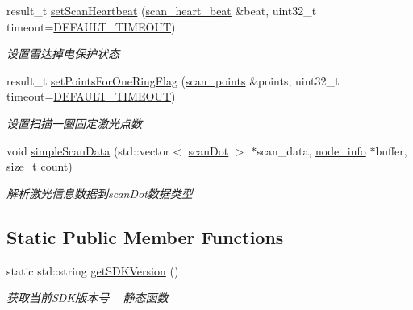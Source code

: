 \begin{DoxyCompactItemize}
\begin{DoxyCompactList}
\end{DoxyCompactList}\item 
result\+\_\+t \hyperlink{classydlidar_1_1_y_dlidar_driver_ab2d5434c9b640a38f9d3b43b07c0b3eb}{set\+Scan\+Heartbeat} (\hyperlink{structscan__heart__beat}{scan\+\_\+heart\+\_\+beat} \&beat, uint32\+\_\+t timeout=\hyperlink{classydlidar_1_1_y_dlidar_driver_a13a4f2dc4067b43794b2c47c06d5d27aa07c79ce96f468ff4b40495ef84584442}{D\+E\+F\+A\+U\+L\+T\+\_\+\+T\+I\+M\+E\+O\+UT})
\begin{DoxyCompactList}\small\item\em 设置雷达掉电保护状态 ~\newline
\end{DoxyCompactList}\item 
result\+\_\+t \hyperlink{classydlidar_1_1_y_dlidar_driver_a1c8d40889885386e6c5a7827b7747696}{set\+Points\+For\+One\+Ring\+Flag} (\hyperlink{structscan__points}{scan\+\_\+points} \&points, uint32\+\_\+t timeout=\hyperlink{classydlidar_1_1_y_dlidar_driver_a13a4f2dc4067b43794b2c47c06d5d27aa07c79ce96f468ff4b40495ef84584442}{D\+E\+F\+A\+U\+L\+T\+\_\+\+T\+I\+M\+E\+O\+UT})
\begin{DoxyCompactList}\small\item\em 设置扫描一圈固定激光点数 ~\newline
\end{DoxyCompactList}\item 
void \hyperlink{classydlidar_1_1_y_dlidar_driver_a797de2678c6c81c84a8126cf184a0254}{simple\+Scan\+Data} (std\+::vector$<$ \hyperlink{structscan_dot}{scan\+Dot} $>$ $\ast$scan\+\_\+data, \hyperlink{structnode__info}{node\+\_\+info} $\ast$buffer, size\+\_\+t count)
\begin{DoxyCompactList}\small\item\em 解析激光信息数据到scan\+Dot数据类型 ~\newline
\end{DoxyCompactList}\end{DoxyCompactItemize}
\subsection*{Static Public Member Functions}
\begin{DoxyCompactItemize}
\item 
static std\+::string \hyperlink{classydlidar_1_1_y_dlidar_driver_a542dc18ac8dbcda2a51657cf9bd44ae0}{get\+S\+D\+K\+Version} ()
\begin{DoxyCompactList}\small\item\em 获取当前\+S\+D\+K版本号 ~\newline
静态函数 \end{DoxyCompactList}\end{DoxyCompactItemize}
